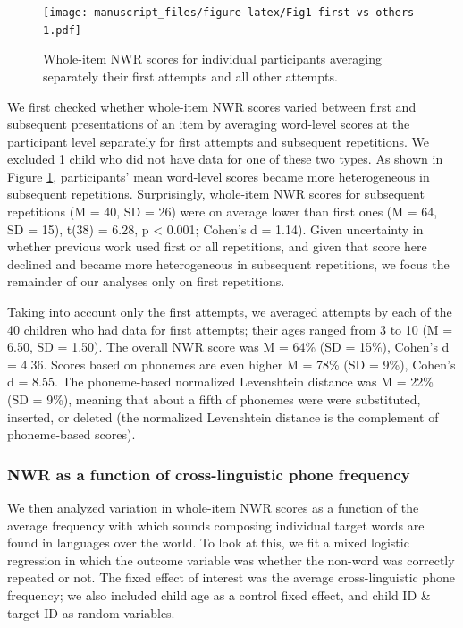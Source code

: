 \documentclass[english,,man,floatsintext]{apa6}
\begin{document}
\begin{figure}
\centering
\texttt{[image: manuscript\_files/figure-latex/Fig1-first-vs-others-1.pdf]}
\caption{\label{fig:Fig1-first-vs-others}Whole-item NWR scores for individual participants averaging separately their first attempts and all other attempts.}
\end{figure}

We first checked whether whole-item NWR scores varied between first and subsequent presentations of an item by averaging word-level scores at the participant level separately for first attempts and subsequent repetitions. We excluded 1 child who did not have data for one of these two types. As shown in Figure \ref{fig:Fig1-first-vs-others}, participants' mean word-level scores became more heterogeneous in subsequent repetitions. Surprisingly, whole-item NWR scores for subsequent repetitions (M = 40, SD = 26)
were on average lower than first ones (M = 64, SD = 15), t(38) = 6.28, p \textless{} 0.001; Cohen's d = 1.14). Given uncertainty in whether previous work used first or all repetitions, and given that score here declined and became more heterogeneous in subsequent repetitions, we focus the remainder of our analyses only on first repetitions.

Taking into account only the first attempts, we averaged attempts by each of the 40 children who had data for first attempts; their ages ranged from 3 to 10 (M = 6.50, SD = 1.50). The overall NWR score was M = 64\% (SD = 15\%), Cohen's d = 4.36. Scores based on phonemes are even higher M = 78\% (SD = 9\%), Cohen's d = 8.55. The phoneme-based normalized Levenshtein distance was M = 22\% (SD = 9\%), meaning that about a fifth of phonemes were were substituted, inserted, or deleted (the normalized Levenshtein distance is the complement of phoneme-based scores).

\hypertarget{nwr-as-a-function-of-cross-linguistic-phone-frequency}{%
\subsubsection{NWR as a function of cross-linguistic phone frequency}\label{nwr-as-a-function-of-cross-linguistic-phone-frequency}}

We then analyzed variation in whole-item NWR scores as a function of the average frequency with which sounds composing individual target words are found in languages over the world. To look at this, we fit a mixed logistic regression in which the outcome variable was whether the non-word was correctly repeated or not. The fixed effect of interest was the average cross-linguistic phone frequency; we also included child age as a control fixed effect, and child ID \& target ID as random variables.
\end{document}
